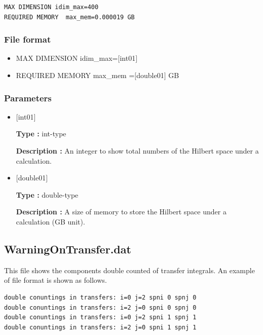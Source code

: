 \begin{minipage}{12.5cm}
\begin{screen}
\begin{verbatim}
MAX DIMENSION idim_max=400 
REQUIRED MEMORY  max_mem=0.000019 GB 
\end{verbatim}
\end{screen}
\end{minipage}

\subsubsection{File format}
 \begin{itemize}
   \item  MAX DIMENSION idim\_max=$[$int01$]$
   \item  REQUIRED MEMORY  max\_mem =$[$double01$]$ GB 
 \end{itemize}
 
\subsubsection{Parameters}
 \begin{itemize}

    \item  $[$int01$]$ 
   
    {\bf Type :} int-type

   {\bf Description :} An integer to show total numbers of the Hilbert space under a calculation.
      
   \item  $[$double01$]$
   
    {\bf Type :} double-type

    {\bf Description :}  
    A size of memory to store the Hilbert space under a calculation (GB unit).
 
\end{itemize}

\newpage
\subsection{WarningOnTransfer.dat}
This file shows the components double counted of transfer integrals.
An example of file format is shown as follows.

\begin{minipage}{12.5cm}
\begin{screen}
\begin{verbatim}
double conuntings in transfers: i=0 j=2 spni 0 spnj 0  
double conuntings in transfers: i=2 j=0 spni 0 spnj 0  
double conuntings in transfers: i=0 j=2 spni 1 spnj 1  
double conuntings in transfers: i=2 j=0 spni 1 spnj 1  
\end{verbatim}
\end{screen}
\end{minipage}

